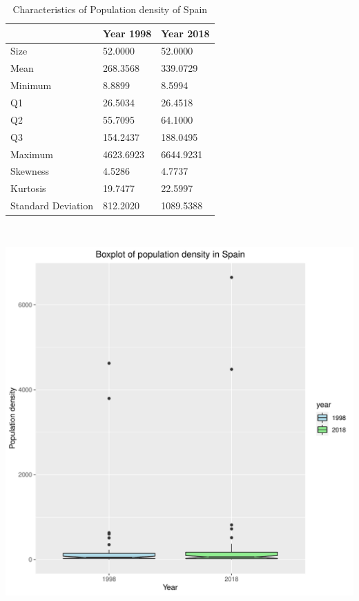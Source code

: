 \documentclass[12pt, oneside]{report}\usepackage[]{graphicx}\usepackage[]{color}
\begin{document}
\begin{table}[ht]
\centering
\begin{tabular}{|l|l|l|}
  \hline
 & Year 1998 & Year 2018 \\ 
  \hline
Size &   52.0000 &   52.0000 \\ 
  Mean &  268.3568 &  339.0729 \\ 
  Minimum &    8.8899 &    8.5994 \\ 
  Q1 &   26.5034 &   26.4518 \\ 
  Q2 &   55.7095 &   64.1000 \\ 
  Q3 &  154.2437 &  188.0495 \\ 
  Maximum & 4623.6923 & 6644.9231 \\ 
  Skewness &    4.5286 &    4.7737 \\ 
  Kurtosis &   19.7477 &   22.5997 \\ 
  Standard Deviation &  812.2020 & 1089.5388 \\ 
   \hline
\end{tabular}
\caption{Characteristics of Population density of Spain} 
\end{table}


\begin{Schunk}


{\centering \includegraphics[width=15cm,height=15cm]{figure/unnamed-chunk-18-1} 

}

\end{Schunk}
\end{document}
